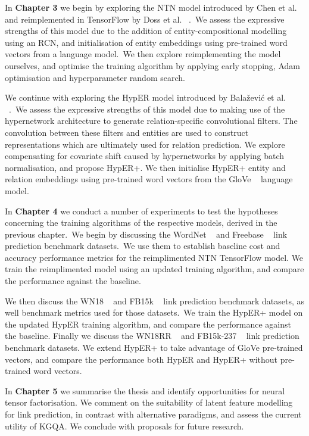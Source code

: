 \noindent In \textbf{Chapter 3} we begin by exploring the NTN model introduced by Chen et al. \unskip ~\citep{socher2013reasoning} and reimplemented in TensorFlow by Doss et al. \unskip ~\citep{Doss2015}.\ We assess the expressive strengths of this model due to the addition of entity-compositional modelling using an RCN, and initialisation of entity embeddings using pre-trained word vectors from a language model.\ We then explore reimplementing the model ourselves, and optimise the training algorithm by applying early stopping, Adam optimisation and hyperparameter random search. \par

\noindent We continue with exploring the HypER model introduced by Bala\v{z}evi\'c et al. \unskip ~\citep{balazevic2019hypernetwork}.\ We assess the expressive strengths of this model due to making use of the hypernetwork architecture to generate relation-specific convolutional filters. The convolution between these filters and entities are used to construct representations which are ultimately used for relation prediction. We explore compensating for covariate shift caused by hypernetworks by applying batch normalisation, and propose HypER+. We then initialise HypER+ entity and relation embeddings using pre-trained word vectors from the GloVe \unskip~\citep{pennington2014glove} language model. \par

\noindent In \textbf{Chapter 4} we conduct a number of experiments to test the hypotheses concerning the training algorithms of the respective models, derived in the previous chapter.\ We begin by discussing the WordNet \unskip ~\citep{miller1995wordnet} and Freebase \unskip ~\citep{bollacker2008freebase} link prediction benchmark datasets.\ We use them to establish baseline cost and accuracy performance metrics for the reimplimented NTN TensorFlow model. We train the reimplimented model using an updated training algorithm, and compare the performance against the baseline. \par

\noindent We then discuss the WN18 \unskip ~\citep{bordes2014semantic} and FB15k \unskip ~\citep{bordes2013translating} link prediction benchmark datasets, as well benchmark metrics used for those datasets.\ We train the HypER+ model on the updated HypER training algorithm, and compare the performance against the baseline. Finally we discuss the WN18RR \unskip ~\citep{dettmers2018convolutional} and FB15k-237 \unskip ~\citep{toutanova2015observed} link prediction benchmark datasets. We extend HypER+ to take advantage of GloVe pre-trained vectors, and compare the performance both HypER and HypER+ without pre-trained word vectors. \par

\noindent In \textbf{Chapter 5} we summarise the thesis and identify opportunities for neural tensor factorisation. We comment on the suitability of latent feature modelling for link prediction, in contrast with alternative paradigms, and assess the current utility of KGQA. We conclude with proposals for future research.

